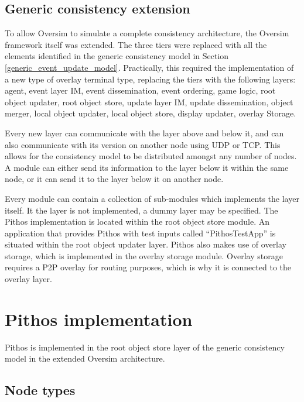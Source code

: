     \subsection{Generic consistency extension}
    \label{generic_consistency_extension}


To allow Oversim to simulate a complete consistency architecture, the Oversim framework itself was extended. The three tiers were replaced with all the elements identified in the generic consistency model in Section \ref{generic_event_update_model}. Practically, this required the implementation of a new type of overlay terminal type, replacing the tiers with the following layers: agent, event layer IM, event dissemination, event ordering, game logic, root object updater, root object store, update layer IM, update dissemination, object merger, local object updater, local object store, display updater, overlay Storage.

Every new layer can communicate with the layer above and below it, and can also communicate with its version on another node using UDP or TCP. This allows for the consistency model to be distributed amongst any number of nodes. A module can either send its information to the layer below it within the same node, or it can send it to the layer below it on another node.

Every module can contain a collection of sub-modules which implements the layer itself. It the layer is not implemented, a dummy layer may be specified. The Pithos implementation is located within the root object store module. An application that provides Pithos with test inputs called ``PithosTestApp'' is situated within the root object updater layer. Pithos also makes use of overlay storage, which is implemented in the overlay storage module. Overlay storage requires a P2P overlay for routing purposes, which is why it is connected to the overlay layer.

\section{Pithos implementation}

Pithos is implemented in the root object store layer of the generic consistency model in the extended Oversim architecture.

\subsection{Node types}
\label{pithos_node_types}

